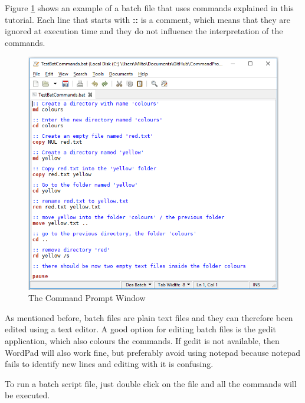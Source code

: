 \documentclass{article}
\begin{document}
    \par Figure \ref{fig:BatchFile} shows an example of a batch file that uses commands explained in this tutorial. Each line that starts with \textbf{::} is a comment, which means that they are ignored at execution time and they do not influence the interpretation of the commands. 
	
		\begin{figure}[!htbp]
			\includegraphics[width=\textwidth]{BatCommands.png}
			\caption{The Command Prompt Window}
			\label{fig:BatchFile}
		\end{figure}
	 
	\par As mentioned before, batch files are plain text files and they can therefore been edited using a text editor. A good option for editing batch files is the gedit application, which also colours the commands. If gedit is not available, then WordPad will also work fine, but preferably avoid using notepad because notepad fails to identify new lines and editing with it is confusing. 
	
	\par To run a batch script file, just double click on the file and all the commands will be executed. 
	
\end{document}
